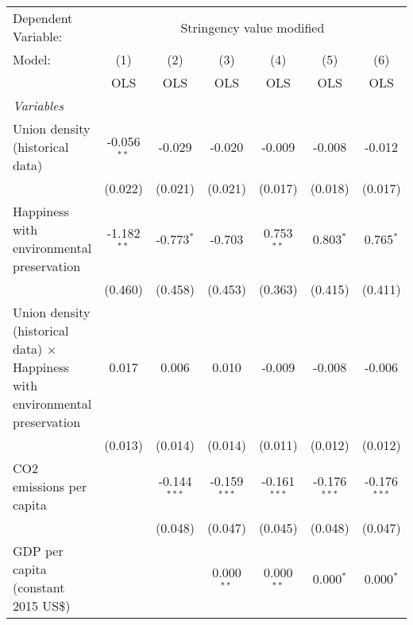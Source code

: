 
\begingroup
\centering
\begin{tabular}{lcccccc}
   \toprule
   Dependent Variable: & \multicolumn{6}{c}{Stringency value modified}\\
   Model:                                                                              & (1)           & (2)            & (3)            & (4)            & (5)            & (6)\\  
                                                                                       &  OLS          & OLS            & OLS            & OLS            & OLS            & OLS\\  
   \midrule
   \emph{Variables}\\
   Union density (historical data)                                                     & -0.056$^{**}$ & -0.029         & -0.020         & -0.009         & -0.008         & -0.012\\   
                                                                                       & (0.022)       & (0.021)        & (0.021)        & (0.017)        & (0.018)        & (0.017)\\   
   Happiness with environmental preservation                                           & -1.182$^{**}$ & -0.773$^{*}$   & -0.703         & 0.753$^{**}$   & 0.803$^{*}$    & 0.765$^{*}$\\   
                                                                                       & (0.460)       & (0.458)        & (0.453)        & (0.363)        & (0.415)        & (0.411)\\   
   Union density (historical data) $\times$ Happiness with environmental preservation  & 0.017         & 0.006          & 0.010          & -0.009         & -0.008         & -0.006\\   
                                                                                       & (0.013)       & (0.014)        & (0.014)        & (0.011)        & (0.012)        & (0.012)\\   
   CO2 emissions per capita                                                            &               & -0.144$^{***}$ & -0.159$^{***}$ & -0.161$^{***}$ & -0.176$^{***}$ & -0.176$^{***}$\\   
                                                                                       &               & (0.048)        & (0.047)        & (0.045)        & (0.048)        & (0.047)\\   
   GDP per capita (constant 2015 US\$)                                                 &               &                & 0.000$^{**}$   & 0.000$^{**}$   & 0.000$^{*}$    & 0.000$^{*}$\\   

\end{tabular}
